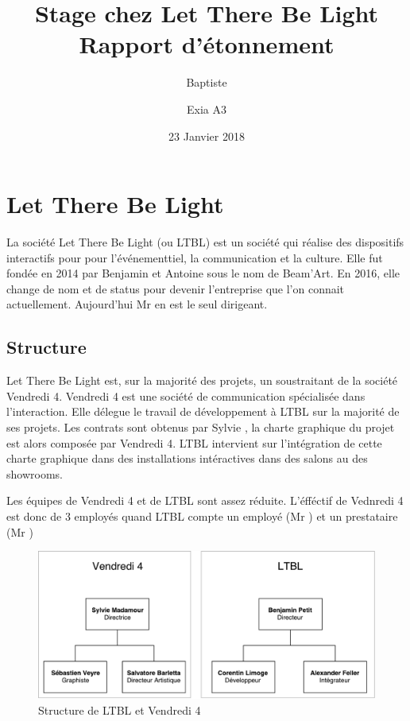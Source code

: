 \documentclass{article}
\title{Stage chez Let There Be Light \\ \large Rapport d'étonnement}
\date{23 Janvier 2018}
\author{Baptiste \bsc{Saclier} \and Exia A3}
\begin{document}
\maketitle

\vspace{3cm}

\tableofcontents

\clearpage

\section{Let There Be Light}

La société Let There Be Light (ou LTBL) est un société qui réalise des dispositifs interactifs pour pour l'événementtiel, la communication et la culture.
Elle fut fondée en 2014 par Benjamin  et Antoine  sous le nom de Beam'Art.
En 2016, elle change de nom et de status pour devenir l'entreprise que l'on connait actuellement.
Aujourd'hui Mr  en est le seul dirigeant.


\subsection{Structure}

Let There Be Light est, sur la majorité des projets, un soustraitant de la société Vendredi 4.
Vendredi 4 est une société de communication spécialisée dans l'interaction.
Elle délegue le travail de développement à LTBL sur la majorité de ses projets.
Les contrats sont obtenus par Sylvie , la charte graphique du projet est alors composée par Vendredi 4.
LTBL intervient sur l'intégration de cette charte graphique dans des installations intéractives dans des salons au des showrooms.

Les équipes de Vendredi 4 et de LTBL sont assez réduite.
L'éfféctif de Vednredi 4 est donc de 3 employés quand LTBL compte un employé (Mr ) et un prestataire (Mr )

\begin{figure}[h]
    \centering
    \includegraphics[scale=0.7]{Structure-LTBL.pdf}
    \caption{Structure de LTBL et Vendredi 4}
\end{figure}
\end{document}
